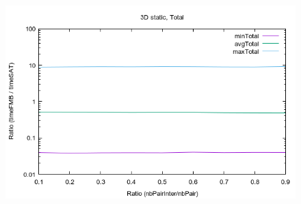 \documentclass[12pt, a4paper]{article}
\begin{document}
\begin{adjustbox}{angle=90}
\begin{scriptsize}
\begin{ttfamily}
\end{ttfamily}
\end{scriptsize}
\end{adjustbox}


\begin{scriptsize}
\begin{ttfamily}

\end{ttfamily}
\end{scriptsize}

\begin{center}
\begin{figure}[H]
\centering\includegraphics[width=12cm]{../Results/qualification3D.png}\\
\end{figure}
\end{center}
\end{document}
